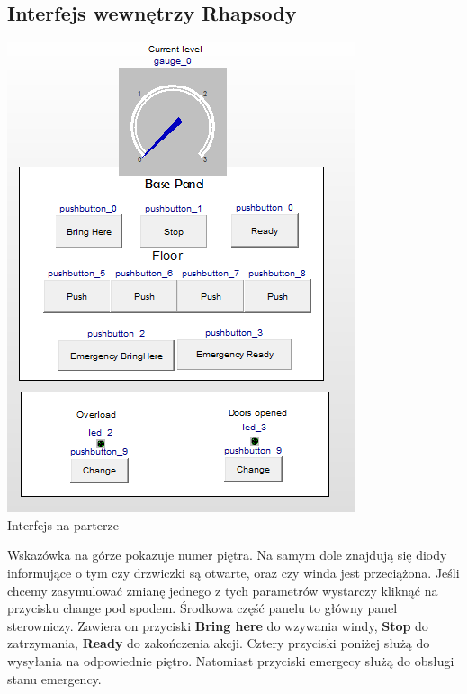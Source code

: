 \documentclass[a4paper,11pt]{article}
\begin{document}
\subsection{Interfejs wewnętrzy Rhapsody}
\begin{center} 
\includegraphics{images/rGuiBase.PNG} \\Interfejs na parterze\\ 
\end{center} 
Wskazówka na górze pokazuje numer piętra. Na samym dole znajdują się diody informujące o tym czy drzwiczki są otwarte, oraz
czy winda jest przeciążona. Jeśli chcemy zasymulować zmianę jednego z tych parametrów wystarczy kliknąć na przycisku change pod spodem.
Środkowa część panelu to główny panel sterowniczy. Zawiera on przyciski \textbf{Bring here} do wzywania windy, \textbf{Stop}
do zatrzymania, \textbf{Ready} do zakończenia akcji. Cztery przyciski poniżej służą do wysyłania na odpowiednie piętro.
Natomiast przyciski emergecy służą do obsługi stanu emergency.
\end{document}
